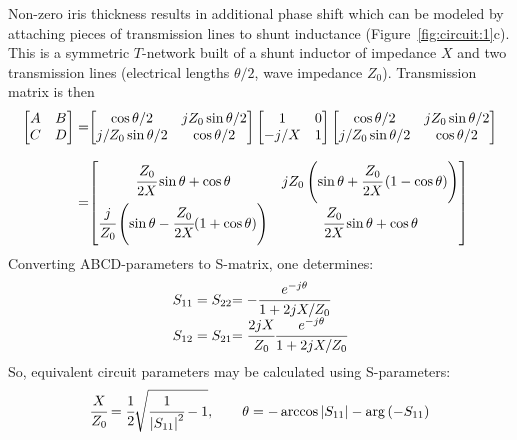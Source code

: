 \documentclass{pj}
\begin{document}
Non-zero iris thickness results in additional phase shift which can be
modeled by attaching pieces of transmission lines to shunt inductance
(Figure~\ref{fig:circuit:1}c).  This is a symmetric $T$-network built
of a shunt inductor of impedance $X$ and two transmission lines
(electrical lengths $\theta/2$, wave impedance $Z_0$). Transmission
matrix is then
\begin{equation}
  \label{eq:abcd_matrix}
  \begin{array}{r@{}l}
  \begin{bmatrix}
    A & B \\
    C & D
  \end{bmatrix}
        = & 
  \begin{bmatrix}
    \cos{\theta/2} & j Z_0 \sin{\theta/2} \\
    j/Z_0 \sin{\theta/2} & \cos{\theta/2}
  \end{bmatrix}
  \begin{bmatrix}
    1 & 0 \\
    -j/X & 1
  \end{bmatrix}
  \begin{bmatrix}
    \cos{\theta/2} & j Z_0 \sin{\theta/2} \\
    j/Z_0 \sin{\theta/2} & \cos{\theta/2}
  \end{bmatrix} \\
    & \\
    = &
        \begin{bmatrix}
          \cfrac{Z_0}{2 X} \sin{\theta} + \cos{\theta} & j Z_0
          \left(\sin{\theta + \cfrac{Z_0}{2 X}
              \left(1-\cos{\theta}\right)}\right) \\
          \cfrac{j}{Z_0} \left(\sin{\theta} - \cfrac{Z_0}{2 X} (1 +
            \cos{\theta})\right) & \cfrac{Z_0}{2 X} \sin{\theta} + \cos{\theta}
        \end{bmatrix}
  \end{array}
\end{equation}
Converting ABCD-parameters to S-matrix, one determines:
\begin{equation}
  \label{eq:abcd_to_s}
  \begin{array}{r@{}l}
    S_{11} = S_{22} & = - \cfrac{e^{-j\theta}}{1 + 2jX/Z_0} \\
    S_{12} = S_{21} & = \cfrac{2j X}{Z_0} \cfrac{e^{-j\theta}}{1 + 2jX/Z_0} \\
  \end{array}
\end{equation}
So, equivalent circuit parameters may be calculated using S-parameters:
\begin{equation}
  \label{eq:equivalent_circuit}
  \cfrac{X}{Z_0} =
  \cfrac{1}{2}\sqrt{\cfrac{1}{\left|S_{11}\right|^2}-1} , \quad\quad
  \theta = -\arccos{\left|S_{11}\right|} - \arg{\left(-S_{11}\right)}
\end{equation}
\end{document}
